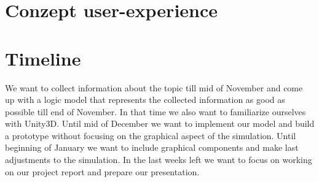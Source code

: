 \documentclass{acm_proc_article-sp}
\begin{document}
\section{Conzept user-experience}

\section{Timeline}
We want to collect information about the topic till mid of November and come up with a logic model that represents the collected information as good as possible till end of November. In that time we also want to familiarize ourselves with Unity3D. Until mid of  December we want to implement our model and build a prototype without focusing on the graphical aspect of the simulation.  Until beginning of January we want to include graphical components and make last adjustments to the simulation. In the last weeks left we want to focus on working on our project report and prepare our presentation.
\end{document}
